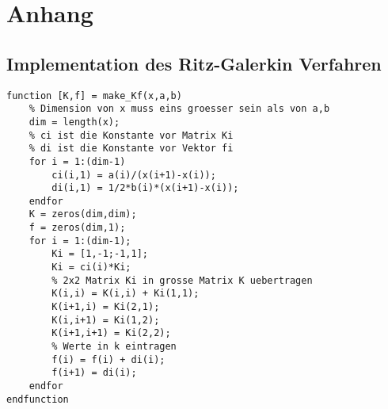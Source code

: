 \section{Anhang}

\subsection*{Implementation des Ritz-Galerkin Verfahren}
\begin{lstlisting}[caption={Routine \texttt{make\_Kf} in Octave zur Berechnung der Matrizen $K$ und $f$}, label=code]
function [K,f] = make_Kf(x,a,b)
	% Dimension von x muss eins groesser sein als von a,b
	dim = length(x);
	% ci ist die Konstante vor Matrix Ki
	% di ist die Konstante vor Vektor fi
	for i = 1:(dim-1)
		ci(i,1) = a(i)/(x(i+1)-x(i));
		di(i,1) = 1/2*b(i)*(x(i+1)-x(i));
	endfor
	K = zeros(dim,dim);
	f = zeros(dim,1);
	for i = 1:(dim-1);
		Ki = [1,-1;-1,1];
		Ki = ci(i)*Ki;
		% 2x2 Matrix Ki in grosse Matrix K uebertragen
		K(i,i) = K(i,i) + Ki(1,1);
		K(i+1,i) = Ki(2,1);
		K(i,i+1) = Ki(1,2);
		K(i+1,i+1) = Ki(2,2);
		% Werte in k eintragen
		f(i) = f(i) + di(i);
		f(i+1) = di(i);
	endfor
endfunction
\end{lstlisting}

